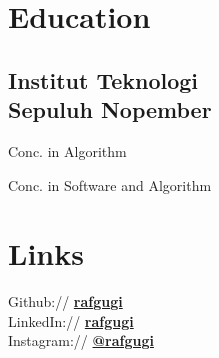 \documentclass[letterpaper]{deedy-resume} %
\begin{document}



\begin{minipage}[t]{0.33\textwidth} %


\section{Education}

\subsection[ITS]{Institut Teknologi\\Sepuluh Nopember}

Conc. in Algorithm \\
\sectionspace

Conc. in Software and Algorithm \\
\sectionspace


\section{Links}

Github:// \href{https://github.com/rafgugi}{\bf rafgugi} \\
LinkedIn:// \href{https://www.linkedin.com/in/rafgugi}{\bf rafgugi} \\
Instagram:// \href{https://instagram.com/rafgugi}{\bf @rafgugi} \\
\sectionspace


\end{minipage}
\end{document}
